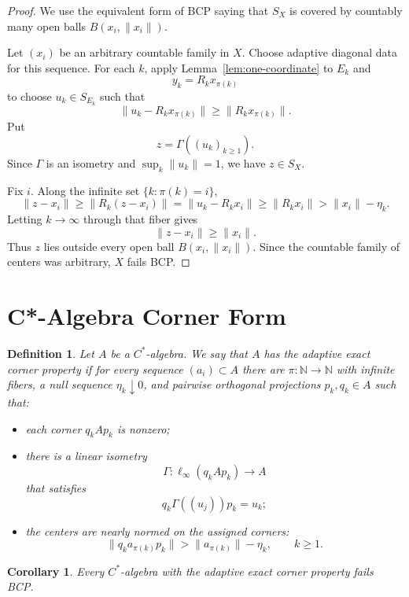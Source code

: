 \documentclass[11pt]{article}
\newtheorem{corollary}{Corollary}
\newtheorem{definition}{Definition}
\newcommand{\N}{\mathbb N}
\begin{document}
\begin{proof}
We use the equivalent form of BCP saying that \(S_X\) is covered by countably
many open balls \(B(x_i,\|x_i\|)\).

Let \((x_i)\) be an arbitrary countable family in \(X\).  Choose adaptive
diagonal data for this sequence.  For each \(k\), apply
Lemma~\ref{lem:one-coordinate} to \(E_k\) and
\[
        y_k=R_k x_{\pi(k)}
\]
to choose \(u_k\in S_{E_k}\) such that
\[
        \|u_k-R_kx_{\pi(k)}\|\ge \|R_kx_{\pi(k)}\|.
\]
Put
\[
        z=\Gamma((u_k)_{k\ge1}).
\]
Since \(\Gamma\) is an isometry and \(\sup_k\|u_k\|=1\), we have \(z\in S_X\).

Fix \(i\).  Along the infinite set \(\{k:\pi(k)=i\}\),
\[
        \|z-x_i\|
        \ge
        \|R_k(z-x_i)\|
        =
        \|u_k-R_kx_i\|
        \ge
        \|R_kx_i\|
        >
        \|x_i\|-\eta_k .
\]
Letting \(k\to\infty\) through that fiber gives
\[
        \|z-x_i\|\ge \|x_i\|.
\]
Thus \(z\) lies outside every open ball \(B(x_i,\|x_i\|)\).  Since the
countable family of centers was arbitrary, \(X\) fails BCP.
\end{proof}

\section*{C*-Algebra Corner Form}

\begin{definition}
Let \(A\) be a \(C^*\)-algebra.  We say that \(A\) has the adaptive exact
corner property if for every sequence \((a_i)\subset A\) there are
\(\pi:\N\to\N\) with infinite fibers, a null sequence \(\eta_k\downarrow0\),
and pairwise orthogonal projections \(p_k,q_k\in A\) such that:
\begin{itemize}
\item each corner \(q_kAp_k\) is nonzero;
\item there is a linear isometry
\[
        \Gamma:\ell_\infty(q_kAp_k)\to A
\]
that satisfies
\[
        q_k\Gamma((u_j))p_k=u_k;
\]
\item the centers are nearly normed on the assigned corners:
\[
        \|q_ka_{\pi(k)}p_k\|>\|a_{\pi(k)}\|-\eta_k,\qquad k\ge1.
\]
\end{itemize}
\end{definition}

\begin{corollary}
\label{cor:cstar-corner}
Every \(C^*\)-algebra with the adaptive exact corner property fails BCP.
\end{corollary}
\end{document}
